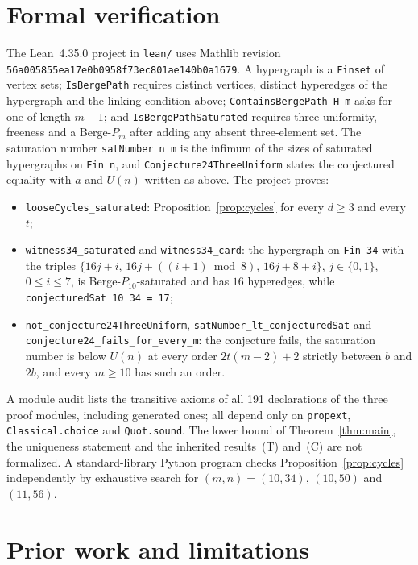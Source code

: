 \documentclass[11pt]{article}
\theoremstyle{definition}
\theoremstyle{remark}
\begin{document}
\section{Formal verification}\label{sec:lean}
\sloppy

The Lean~4.35.0 project in \texttt{lean/} uses Mathlib revision
\texttt{56a005855ea17e0b0958f73ec801ae140b0a1679}. A hypergraph is a
\texttt{Finset} of vertex sets; \texttt{IsBergePath} requires distinct
vertices, distinct hyperedges of the hypergraph and the linking condition
above; \texttt{ContainsBergePath H m} asks for one of length $m-1$; and
\texttt{IsBergePathSaturated} requires three-uniformity, freeness and a
Berge-$P_m$ after adding any absent three-element set. The saturation number
\texttt{satNumber n m} is the infimum of the sizes of saturated hypergraphs
on \texttt{Fin n}, and \texttt{Conjecture24ThreeUniform} states the
conjectured equality with $a$ and $U(n)$ written as above. The project
proves:
\begin{itemize}
\item \texttt{looseCycles\_saturated}: Proposition~\ref{prop:cycles} for
every $d\ge3$ and every $t$;
\item \texttt{witness34\_saturated} and \texttt{witness34\_card}: the
hypergraph on \texttt{Fin 34} with the triples
$\{16j+i,\,16j+((i+1)\bmod 8),\,16j+8+i\}$, $j\in\{0,1\}$, $0\le i\le7$, is
Berge-$P_{10}$-saturated and has $16$ hyperedges, while
\texttt{conjecturedSat 10 34 = 17};
\item \texttt{not\_conjecture24ThreeUniform},
\texttt{satNumber\_lt\_conjecturedSat} and
\texttt{conjecture24\_fails\_for\_every\_m}: the conjecture fails, the
saturation number is below $U(n)$ at every order $2t(m-2)+2$ strictly
between $b$ and $2b$, and every $m\ge10$ has such an order.
\end{itemize}
A module audit lists the transitive axioms of all 191 declarations of the
three proof modules, including generated ones; all depend only on
\texttt{propext}, \texttt{Classical.choice} and \texttt{Quot.sound}. The
lower bound of Theorem~\ref{thm:main}, the uniqueness statement and the
inherited results~(T) and~(C) are not formalized. A standard-library
Python program checks Proposition~\ref{prop:cycles} independently by
exhaustive search for $(m,n)=(10,34)$, $(10,50)$ and $(11,56)$.

\fussy
\section{Prior work and limitations}\label{sec:prior}
\end{document}
